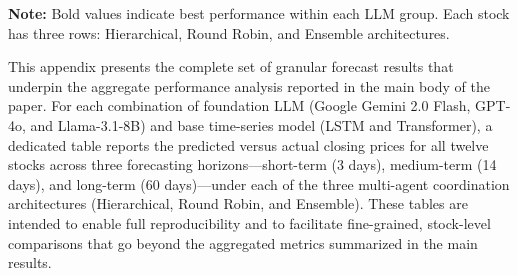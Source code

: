 \documentclass{ieeeaccess}
\begin{document}
{\vspace{0.3cm}
\footnotesize
\textbf{Note:} Bold values indicate best performance within each LLM group. Each stock has three rows: Hierarchical, Round Robin, and Ensemble architectures.
}


This appendix presents the complete set of granular forecast results that underpin the aggregate performance analysis reported in the main body of the paper. For each combination of foundation LLM (Google Gemini 2.0 Flash, GPT-4o, and Llama-3.1-8B) and base time-series model (LSTM and Transformer), a dedicated table reports the predicted versus actual closing prices for all twelve stocks across three forecasting horizons---short-term (3 days), medium-term (14 days), and long-term (60 days)---under each of the three multi-agent coordination architectures (Hierarchical, Round Robin, and Ensemble). These tables are intended to enable full reproducibility and to facilitate fine-grained, stock-level comparisons that go beyond the aggregated metrics summarized in the main results.



\clearpage
\onecolumn
\end{document}
